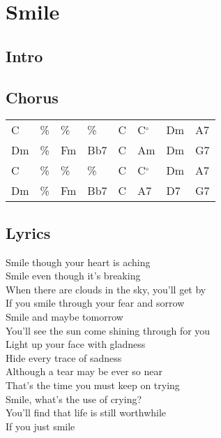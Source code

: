 \section{Smile}


\subsection*{Intro}


\subsection*{Chorus}


\begin{tabular}{l l l l l l l l}
C & \% & \% & \% & C & C$^{\circ}$ & Dm & A7 \\ 
Dm & \% & Fm & Bb7 & C & Am & Dm & G7 \\ 
C & \% & \% & \% & C & C$^{\circ}$ & Dm & A7 \\ 
Dm & \% & Fm & Bb7 & C & A7 & D7 & G7 \\ 
\end{tabular}


\subsection*{Lyrics}


Smile though your heart is aching \\ 
Smile even though it's breaking \\ 
When there are clouds in the sky, you'll get by \\ 

If you smile through your fear and sorrow \\ 
Smile and maybe tomorrow \\ 
You'll see the sun come shining through for you \\ 

Light up your face with gladness \\ 
Hide every trace of sadness \\ 
Although a tear may be ever so near \\ 

That's the time you must keep on trying \\ 
Smile, what's the use of crying? \\ 
You'll find that life is still worthwhile \\ 
If you just smile \\ 
